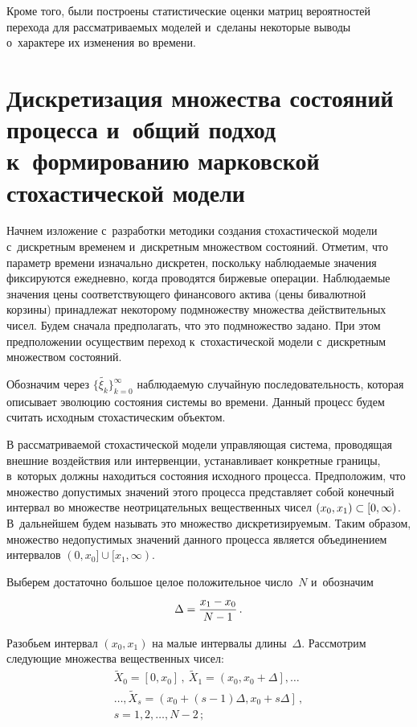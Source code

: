\begin{multicols}{2}
Кроме того, были построены 
статистические оценки мат\-риц вероятностей перехода для рас\-смат\-ри\-ва\-емых 
моделей и~сделаны некоторые выводы о~характере их изменения во времени. 

\section{Дискретизация множества состояний процесса и~общий 
подход к~формированию марковской стохастической модели}

  Начнем изложение с~разработки методики создания стохастической модели 
с~дискретным временем и~дискретным множеством состояний. Отметим, что 
параметр времени изначально \mbox{дискретен}, поскольку наблюдаемые значения 
фиксируются ежедневно, когда проводятся биржевые операции. Наблюдаемые 
значения цены соответствующего финансового актива (цены бивалютной 
корзины) принадлежат некоторому подмножеству множества действительных 
чисел. Будем сначала предполагать, что это подмножество задано. При этом 
предположении осуществим переход к~стохастической модели с~дискретным 
множеством состояний.
  
  Обозначим через $\{ \widetilde{\xi_k}\}^\infty_{k=0}$ наблюдаемую 
случайную последовательность, которая описывает эволюцию состояния 
системы во времени. Данный процесс будем считать исходным стохастическим 
объектом. 
  
  В рассматриваемой стохастической модели управляющая система, 
проводящая внешние воздействия или интервенции, устанавливает конкретные 
границы, в~которых должны находиться состояния исходного процесса. 
Предположим, что\linebreak
 множество допустимых значений этого процесса 
представляет собой конечный интервал во множестве неотрицательных вещественных чисел 
$(x_0, x_1)\hm\subset [0,\infty)$. В~дальнейшем будем называть это множество 
дискретизируемым. Таким образом, множество недопустимых значений 
данного процесса является объединением интервалов
  $(0, x_0]\cup [x_1,\infty)$.
  
  Выберем достаточно большое целое положительное число~$N$ и~обозначим 
$$
\Delta= \displaystyle\frac{\displaystyle x_1-x_0\mathstrut}{\displaystyle N-1\mathstrut}\,.
$$ 

Разобьем интервал $(x_0, x_1)$ на малые 
интервалы длины~$\Delta$. Рассмотрим следующие множества вещественных 
чисел:
  \begin{multline*}
  \tilde{X}_0=[0,x_0]\,,\ \tilde{X}_1=\left( x_0, x_0+\Delta\right],\ldots\\
  \ldots , \tilde{X}_s= \left( x_0+(s-1)\Delta, x_0+s\Delta\right]\,,\\
   s=1,2,\ldots , N- 2\,;
  \end{multline*}
  

\end{multicols}
